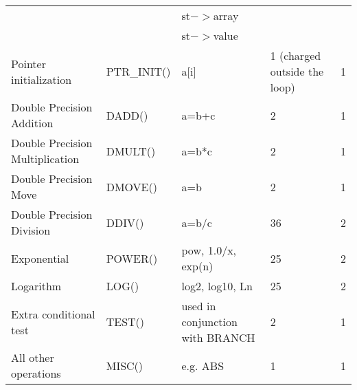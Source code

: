 \begin{center}
\begin{longtable}{|m{3.5cm}|m{2.2cm}|m{3.5cm}|m{2.8cm}|m{1.5cm}|}
& & st$->$array & 	& \\
& & st$->$value	&	&\\
\hline
Pointer initialization &	PTR\_INIT()	&a[i]	&1 (charged outside the loop)	&1\\
\hline
Double Precision Addition	&DADD()	&a=b+c	&2&	1\\
\hline
Double Precision Multiplication	&DMULT()	&a=b*c	& 2&	1\\
\hline
Double Precision Move	&DMOVE()	&a=b&	2	&1\\
\hline
Double Precision Division	&DDIV()&	a=b/c	&36&	2\\
\hline
Exponential	& POWER()	& pow, 1.0/x, exp(n)	&25	&2 \\
\hline
Logarithm	&LOG()&	log2, log10, Ln	&25	&2\\
\hline
Extra conditional test& 	TEST()&	used in conjunction with BRANCH &	2	&1\\
\hline
All other operations&	MISC()&	e.g. ABS&	1	&1\\
\hline
\end{longtable}
\end{center}

